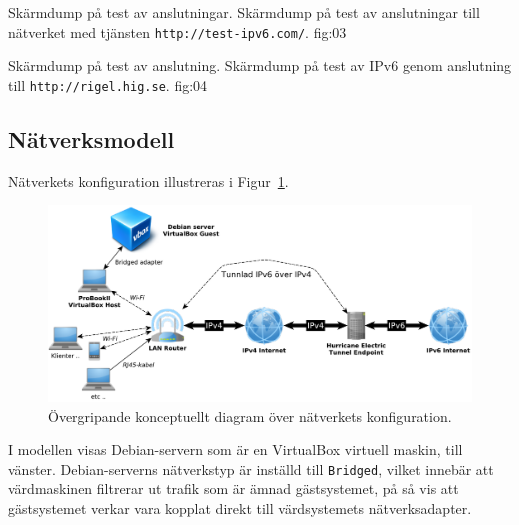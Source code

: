            {Skärmdump på test av anslutningar.}
           {Skärmdump på test av anslutningar till nätverket med tjänsten
            \texttt{http://test-ipv6.com/}.}
           {fig:03}

           {Skärmdump på test av anslutning.}
					 {Skärmdump på test av IPv6 genom anslutning till
						\texttt{http://rigel.hig.se}.}
           {fig:04}


\subsection{Nätverksmodell}
Nätverkets konfiguration illustreras i Figur~\ref{fig:networkgraph}.

\begin{figure}[H]
  \centering
  \includegraphics[width=\linewidth]{include/networkgraph}
  \caption[Diagram över nätverkets konfiguration.]
          {Övergripande konceptuellt diagram över nätverkets
           konfiguration.}
  \label{fig:networkgraph}
\end{figure}

I modellen visas Debian-servern som är en VirtualBox virtuell maskin, till
vänster. Debian-serverns nätverkstyp är inställd till \texttt{Bridged}, vilket
innebär att värdmaskinen filtrerar ut trafik som är ämnad gästsystemet, på så
vis att gästsystemet verkar vara kopplat direkt till värdsystemets
nätverksadapter. \cite{virtualbox:bridged}
